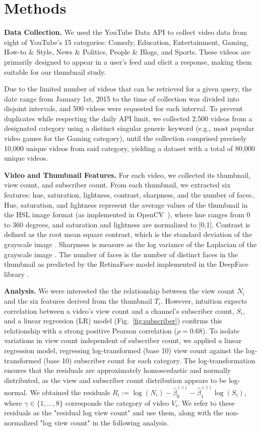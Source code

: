 \documentclass{article}
\begin{document}
\section{Methods}

\textbf{Data Collection.} We used the YouTube Data API \cite{youtubeapi} to collect video data from eight of YouTube's 15 categories: Comedy, Education, Entertainment, Gaming, How-to \& Style, News \& Politics, People \& Blogs, and Sports. These videos are primarily designed to appear in a user's feed and elicit a response, making them suitable for our thumbnail study.

Due to the limited number of videos that can be retrieved for a given query, the date range from January 1st, 2015 to the time of collection was divided into disjoint intervals, and 500 videos were requested for each interval. To prevent duplicates while respecting the daily API limit, we collected 2,500 videos from a designated category using a distinct singular generic keyword (e.g., most popular video games for the Gaming category), until the collection comprised precisely 10,000 unique videos from said category, yielding a dataset with a total of 80,000 unique videos.

\textbf{Video and Thumbnail Features.} For each video, we collected its thumbnail, view count, and subscriber count. From each thumbnail, we extracted six features: hue, saturation, lightness, contrast, sharpness, and the number of faces.. Hue, saturation, and lightness represent the average values of the thumbnail in the HSL image format \cite{HSL} (as implemented in OpenCV~\cite{opencv_library}), where hue ranges from 0 to 360 degrees, and saturation and lightness are normalized to [0,1]. Contrast is defined as the root mean square contrast, which is the standard deviation of the grayscale image \cite{contrast}. Sharpness is measure as the log variance of the Laplacian of the grayscale image \cite{sharpness}. The number of faces is the number of distinct faces in the thumbnail as predicted by the RetinaFace model implemented in the DeepFace library \cite{serengil2024lightface,serengil2020lightface}.

\textbf{Analysis.} We were interested the the relationship between the view count $N_i$ and the six features derived from the thumbnail $T_i$. However, intuition expects correlation between a video's view count and a channel's subscriber count, $S_i$, and a linear regression (LR) model (Fig.~\ref{fig:subscriber}) confirms this relationship with a strong positive Pearson correlation ($\rho=0.68$). 
To isolate variations in view count independent of subscriber count, we applied a linear regression model, regressing log-transformed (base 10) view count against the log-transformed (base 10) subscriber count for each category. The log-transformation ensures that the residuals are approximately homoscedastic and normally distributed, as the view and subscriber count distribution appears to be log-normal. We obtained the residuals $R_{i} := \log(N_i) - \hat{\beta}_0^{(\gamma)} - \hat{\beta}_1^{(\gamma)} \log(S_i)$, where $\gamma \in \{1,..., 8\}$ corresponds the category of video $V_i$. We refer to these residuals as the "residual log view count" and use them, along with the non-normalized "log view count" in the following analysis.
\end{document}
